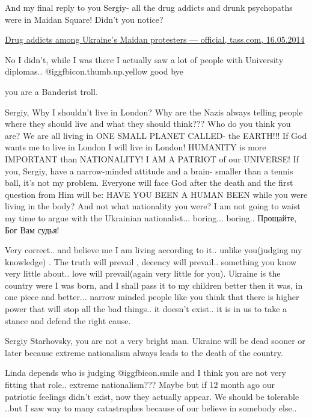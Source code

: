 \begin{itemize}
\begin{itemize}
And my final reply to you Sergiy- all the drug addicts and drunk psychopaths
were in Maidan Square! Didn't you notice?

\href{https://tass.com/world/731910}{%
Drug addicts among Ukraine's Maidan protesters — official, tass.com, 16.05.2014%
}


No I didn't, while I was there I actually saw a lot of people with University
diplomas.. @igg{fbicon.thumb.up.yellow} good bye


you are a Banderist troll.


Sergiy, Why I shouldn't live in London? Why are the Nazis always telling people
where they should live and what they should think??? Who do you think you are?
We are all living in ONE SMALL PLANET CALLED- the EARTH!!! If God wants me to
live in London I will live in London! HUMANITY is more IMPORTANT than
NATIONALITY! I AM A PATRIOT of our UNIVERSE! If you, Sergiy, have a
narrow-minded attitude and a brain- smaller than a tennis ball, it's not my
problem. Everyone will face God after the death and the first question from Him
will be: HAVE YOU BEEN A HUMAN BEEN while you were living in the body? And not
what nationality you were? I am not going to waist my time to argue with the
Ukrainian nationalist... boring... boring.. Прощайте, Бог Вам судья!


Very correct.. and believe me I am living according to it.. unlike you(judging my
knowledge) . The truth will prevail , decency will prevail.. something you know
very little about.. love will prevail(again very little for you). Ukraine is the
country were I was born, and I shall pass it to my children better then it
was, in one piece and better... narrow minded people like you think that there is
higher power that will stop all the bad things.. it doesn't exist.. it is in us
to take a stance and defend the right cause.


Sergiy Starhovsky, you are not a very bright man. Ukraine will be dead sooner
or later because extreme nationalism always leads to the death of the country.


Linda depends who is judging  @igg{fbicon.smile}  and I think you are not very fitting that
role.. extreme nationalism??? Maybe but if 12 month ago our patriotic feelings
didn't exist, now they actually appear. We should be tolerable ..but I saw way
to many catastrophes because of our believe in somebody else..


\end{itemize}
\end{itemize}
